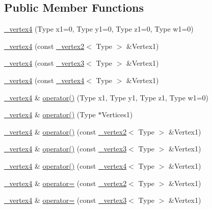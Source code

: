 \subsection*{Public Member Functions}
\begin{DoxyCompactItemize}
\item 
\hyperlink{class__vertex4_a38ffe3ee599cda54fde6710846c776f9}{\+\_\+vertex4} (Type x1=0, Type y1=0, Type z1=0, Type w1=0)
\item 
\hyperlink{class__vertex4_aad670cc7e7a13a298e8e51cb5b54f26d}{\+\_\+vertex4} (const \hyperlink{class__vertex2}{\+\_\+vertex2}$<$ Type $>$ \&Vertex1)
\item 
\hyperlink{class__vertex4_a1d30459481a974f0231f4a829520acfd}{\+\_\+vertex4} (const \hyperlink{class__vertex3}{\+\_\+vertex3}$<$ Type $>$ \&Vertex1)
\item 
\hyperlink{class__vertex4_ac8132b88505ecf1822c4c88108d221bc}{\+\_\+vertex4} (const \hyperlink{class__vertex4}{\+\_\+vertex4}$<$ Type $>$ \&Vertex1)
\item 
\hyperlink{class__vertex4}{\+\_\+vertex4} \& \hyperlink{class__vertex4_a2794ca2fbcd7994e4b0f98d38c7e5061}{operator()} (Type x1, Type y1, Type z1, Type w1=0)
\item 
\hyperlink{class__vertex4}{\+\_\+vertex4} \& \hyperlink{class__vertex4_a8b7a91ece60ec33e6323652aebc4e055}{operator()} (Type $\ast$Vertices1)
\item 
\hyperlink{class__vertex4}{\+\_\+vertex4} \& \hyperlink{class__vertex4_a025bc24a5016754029ed9161ab08f481}{operator()} (const \hyperlink{class__vertex2}{\+\_\+vertex2}$<$ Type $>$ \&Vertex1)
\item 
\hyperlink{class__vertex4}{\+\_\+vertex4} \& \hyperlink{class__vertex4_a2288c35a419eeecd283c8ec43f2d9c5c}{operator()} (const \hyperlink{class__vertex3}{\+\_\+vertex3}$<$ Type $>$ \&Vertex1)
\item 
\hyperlink{class__vertex4}{\+\_\+vertex4} \& \hyperlink{class__vertex4_a0e077c06875d21b45fcfb2f2f87ab91c}{operator()} (const \hyperlink{class__vertex4}{\+\_\+vertex4}$<$ Type $>$ \&Vertex1)
\item 
\hyperlink{class__vertex4}{\+\_\+vertex4} \& \hyperlink{class__vertex4_ac1708cb9c2a92bfb4984e0230a4e2ac0}{operator=} (const \hyperlink{class__vertex2}{\+\_\+vertex2}$<$ Type $>$ \&Vertex1)
\item 
\hyperlink{class__vertex4}{\+\_\+vertex4} \& \hyperlink{class__vertex4_a0b2cabcff50b85c0f66eb4329bb980a1}{operator=} (const \hyperlink{class__vertex3}{\+\_\+vertex3}$<$ Type $>$ \&Vertex1)
\item 

\end{DoxyCompactItemize}
